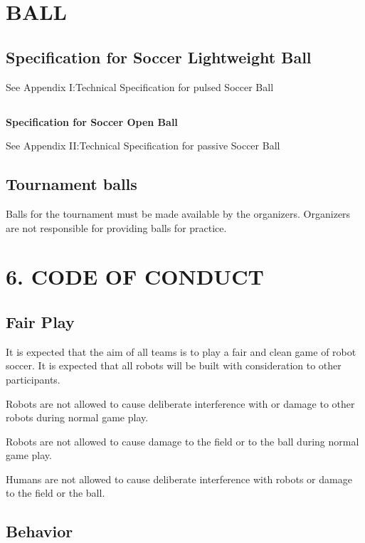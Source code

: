 \documentclass{article}
\begin{document}
\section{BALL \label{ref-038}}

\subsection{ Specification for Soccer Lightweight Ball}

See Appendix I:Technical Specification for pulsed Soccer Ball

\subsection{} \textbf{Specification for Soccer Open Ball}

See Appendix II:Technical Specification for passive Soccer Ball

\subsection{ Tournament balls \label{ref-039}}

Balls for the tournament must be made available by the organizers. Organizers are not responsible for providing balls for practice.

\section{6. CODE OF CONDUCT\label{ref-040}}

\subsection{ Fair Play \label{ref-041}}

It is expected that the aim of all teams is to play a fair and clean game of robot soccer. It is expected that all robots will be built with consideration to other participants.

Robots are not allowed to cause deliberate interference with or damage to other robots during normal game play.

Robots are not allowed to cause damage to the field or to the ball during normal game play.

Humans are not allowed to cause deliberate interference with robots or damage to the field or the ball.

\subsection{ Behavior \label{ref-042}}
\end{document}
